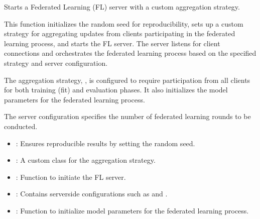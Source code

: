 \documentclass[letterpaper,10pt,english]{sphinxmanual}
\begin{document}
\begin{fulllineitems}
\label{\detokenize{insur_FL_server:insur_FL_server.start_FL_server}}
\pysigstartsignatures
{}
\pysigstopsignatures
\sphinxAtStartPar
Starts a Federated Learning (FL) server with a custom aggregation strategy.

\sphinxAtStartPar
This function initializes the random seed for reproducibility, sets up a custom strategy for aggregating updates from clients participating in the federated learning process, and starts the FL server. The server listens for client connections and orchestrates the federated learning process based on the specified strategy and server configuration.

\sphinxAtStartPar
The aggregation strategy, , is configured to require participation from all clients for both training (fit) and evaluation phases. It also initializes the model parameters for the federated learning process.

\sphinxAtStartPar
The server configuration specifies the number of federated learning rounds to be conducted.
\begin{description}
\begin{itemize}
\item {} 
\sphinxAtStartPar
{}: Ensures reproducible results by setting the random seed.

\item {} 
\sphinxAtStartPar
{}: A custom class for the aggregation strategy.

\item {} 
\sphinxAtStartPar
{}: Function to initiate the FL server.

\item {} 
\sphinxAtStartPar
{}: Contains server\sphinxhyphen{}side configurations such as  and .

\item {} 
\sphinxAtStartPar
{}: Function to initialize model parameters for the federated learning process.

\end{itemize}


\end{description}
\end{fulllineitems}
\end{document}
